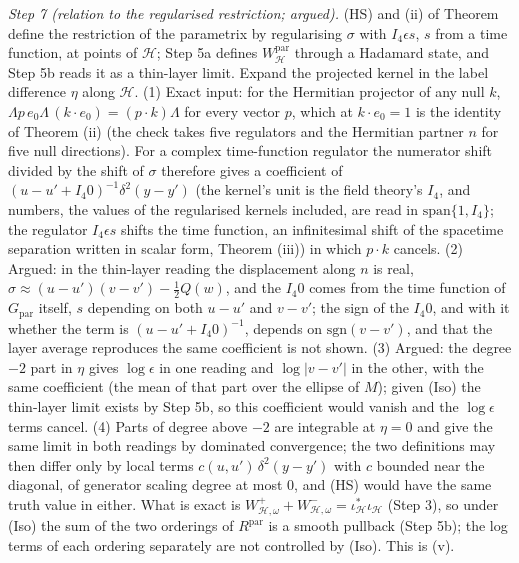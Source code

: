 \emph{Step 7 (relation to the regularised restriction; argued).} (HS) and (ii) of Theorem  define the restriction of the parametrix by regularising $\sigma$ with $I_{4}\epsilon s$, $s$ from a time function, at points of $\mathcal{H}$; Step 5a defines $W^{\mathrm{par}}_{\mathcal{H}}$ through a Hadamard state, and Step 5b reads it as a thin-layer limit. Expand the projected kernel in the label difference $\eta$ along $\mathcal{H}$. (1) Exact input: for the Hermitian projector of any null $k$, $\Lambda p\,e_{0}\Lambda\,(k\cdot e_{0}) = (p\cdot k)\Lambda$ for every vector $p$, which at $k\cdot e_{0} = 1$ is the identity of Theorem (ii) (the check takes five regulators and the Hermitian partner $n$ for five null directions). For a complex time-function regulator the numerator shift divided by the shift of $\sigma$ therefore gives a coefficient of $(u - u' + I_{4}0)^{-1}\delta^{2}(y - y')$ (the kernel's unit is the field theory's $I_{4}$, and numbers, the values of the regularised kernels included, are read in $\mathrm{span}\{1, I_{4}\}$; the regulator $I_{4}\epsilon s$ shifts the time function, an infinitesimal shift of the spacetime separation written in scalar form, Theorem (iii)) in which $p\cdot k$ cancels. (2) Argued: in the thin-layer reading the displacement along $n$ is real, $\sigma \approx (u - u')(v - v') - \tfrac12 Q(w)$, and the $I_{4}0$ comes from the time function of $G_{\mathrm{par}}$ itself, $s$ depending on both $u - u'$ and $v - v'$; the sign of the $I_{4}0$, and with it whether the term is $(u - u' + I_{4}0)^{-1}$, depends on $\mathrm{sgn}(v - v')$, and that the layer average reproduces the same coefficient is not shown. (3) Argued: the degree $-2$ part in $\eta$ gives $\log\epsilon$ in one reading and $\log|v - v'|$ in the other, with the same coefficient (the mean of that part over the ellipse of $M$); given (Iso) the thin-layer limit exists by Step 5b, so this coefficient would vanish and the $\log\epsilon$ terms cancel. (4) Parts of degree above $-2$ are integrable at $\eta = 0$ and give the same limit in both readings by dominated convergence; the two definitions may then differ only by local terms $c(u, u')\,\delta^{2}(y - y')$ with $c$ bounded near the diagonal, of generator scaling degree at most $0$, and (HS) would have the same truth value in either. What is exact is $W^{+}_{\mathcal{H},\omega} + W^{-}_{\mathcal{H},\omega} = \iota_{\mathcal{H}}^{*}\iota_{\mathcal{H}}$ (Step 3), so under (Iso) the sum of the two orderings of $R^{\mathrm{par}}$ is a smooth pullback (Step 5b); the log terms of each ordering separately are not controlled by (Iso). This is (v).

